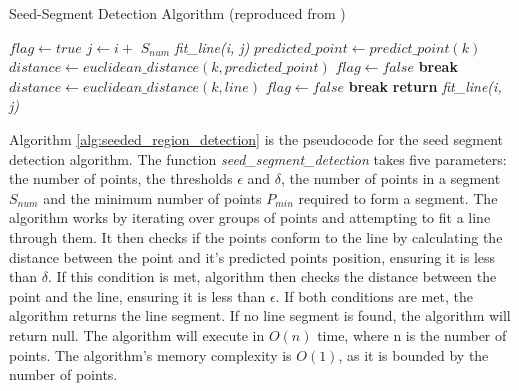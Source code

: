 \documentclass[12pt]{article}
\begin{document}
\begin{algorithm}[H]
    \caption{Seed-Segment Detection Algorithm (reproduced from \cite{seeded_region_growing})}\label{alg:seeded_region_detection}
    \begin{algorithmic}
            \State $flag \gets true$
                \State $j \gets i + $ $S_{num}$
                \State \textit{fit\_line(i, j)}
                    \State $predicted\_point \gets predict\_point(k)$
                    \State $distance \gets euclidean\_distance(k, predicted\_point)$
                        \State $flag \gets false$
                        \State \textbf{break}
                    \EndIf
                    \State $distance \gets euclidean\_distance(k, line)$
                        \State $flag \gets false$
                        \State \textbf{break}
                    \EndIf
                \EndFor
                    \State \textbf{return} \textit{fit\_line(i, j)}
                \EndIf
            \EndFor
        \EndFunction{}
    \end{algorithmic}
\end{algorithm}
Algorithm \ref{alg:seeded_region_detection} is the pseudocode for the seed segment detection algorithm. The function
\textit{seed\_segment\_detection} takes five parameters: the number of points, the thresholds $\epsilon$ and $\delta$, the
number of points in a segment $S_{num}$ and the minimum number of points $P_{min}$ required to form a segment. The algorithm
works by iterating over groups of points and attempting to fit a line through them. It then checks if the points conform to the
line by calculating the distance between the point and it's predicted points position, ensuring it is less than $\delta$. If this condition
is met, algorithm then checks the distance between the point and the line, ensuring it is less than $\epsilon$. If both conditions are
met, the algorithm returns the line segment. If no line segment is found, the algorithm will return null. The algorithm will execute in
\(O(n)\) time, where n is the number of points. The algorithm's memory complexity is \(O(1)\), as it is bounded by the number of points.\\
\end{document}
